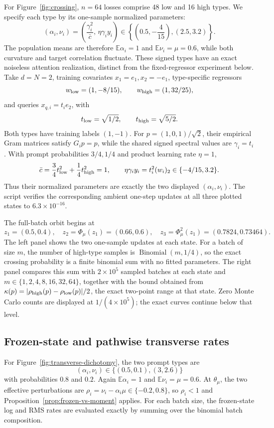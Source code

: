 \documentclass[11pt]{article}
\newcommand{\E}{\mathbb E}
\begin{document}
For Figure~\ref{fig:crossing}, \(n=64\) losses comprise 48 low and 16 high
types.  We specify each type by its one-sample normalized parameters:
\[
(\alpha_i,\nu_i)
=
\left(\frac{\gamma_i^2}{\bar c},\,\eta\gamma_i y_i\right)
\in
\left\{
\left(0.5,-\frac4{15}\right),(2.5,3.2)
\right\}.
\]
The population means are therefore \(\E\alpha_i=1\) and
\(\E\nu_i=\mu=0.6\), while both curvature and target correlation fluctuate.
These signed types have an exact noiseless attention realization, distinct
from the fixed-regressor experiment below.  Take \(d=N=2\), training
covariates \(x_1=e_1,x_2=-e_1\), type-specific regressors
\[
w_{\rm low}=(1,-8/15),\qquad
w_{\rm high}=(1,32/25),
\]
and queries \(x_{q,i}=t_i e_2\), with
\[
t_{\rm low}=\sqrt{1/2},\qquad t_{\rm high}=\sqrt{5/2}.
\]
Both types have training labels \((1,-1)\).  For
\(p=(1,0,1)/\sqrt2\), their empirical Gram matrices satisfy \(G_i p=p\),
while the shared signed spectral values are \(\gamma_i=t_i\).  With prompt
probabilities \(3/4,1/4\) and product learning rate \(\eta=1\),
\[
\bar c=\frac34t_{\rm low}^2+\frac14t_{\rm high}^2=1,\qquad
\eta\gamma_i y_i
=t_i^2(w_i)_2
\in\{-4/15,3.2\}.
\]
Thus their normalized parameters are exactly the two displayed
\((\alpha_i,\nu_i)\).  The script verifies the corresponding ambient
one-step updates at all three plotted states to \(6.3\times10^{-16}\).

The full-batch orbit begins at
\[
z_1=(0.5,0.4),\quad
z_2=\Phi_\mu(z_1)=(0.66,0.6),\quad
z_3=\Phi_\mu^2(z_1)=(0.7824,0.73464).
\]
The left panel shows the two one-sample updates at each state.  For a batch of
size \(m\), the number of high-type samples is
\(\operatorname{Binomial}(m,1/4)\), so the exact crossing probability is a
finite binomial sum with no fitted parameters.  The right panel compares this
sum with \(2\times10^5\) sampled batches at each state and
\(m\in\{1,2,4,8,16,32,64\}\), together with the bound obtained from
\(\kappa(p)=|\rho_{\rm high}(p)-\rho_{\rm low}(p)|/2\), the exact
two-point range at that state.  Zero Monte Carlo counts are displayed at
\(1/(4\times10^5)\); the exact curves continue below that level.

\subsection{Frozen-state and pathwise transverse rates}

For Figure~\ref{fig:transverse-dichotomy}, the two prompt types are
\[
(\alpha_i,\nu_i)\in\{(0.5,0.1),(3,2.6)\}
\]
with probabilities \(0.8\) and \(0.2\).  Again
\(\E\alpha_i=1\) and \(\E\nu_i=\mu=0.6\).  At
\(\theta_\mu\), the two effective perturbations are
\(\rho_i=\nu_i-\alpha_i\mu\in\{-0.2,0.8\}\), so
\(\rho_i<1\) and Proposition~\ref{prop:frozen-vs-moment} applies.  For each
batch size, the frozen-state log and RMS rates are evaluated exactly by
summing over the binomial batch composition.
\end{document}
